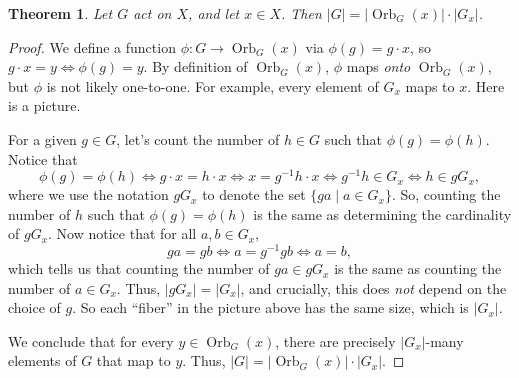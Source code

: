\documentclass[11pt]{amsart}
\theoremstyle{plain}
\newtheorem*{theorem*}{Theorem}
\theoremstyle{definition}
\theoremstyle{remark}
\DeclareMathOperator{\Orb}{Orb}
\begin{document}
\begin{theorem*}
Let $G$ act on $X$, and let $x\in X$. Then $|G| = |\Orb_G(x)|\cdot |G_x|$.
\end{theorem*}
\begin{proof}
We define a function $\phi: G \rightarrow \Orb_G(x)$ via $\phi(g) = g\cdot x$, so  $g\cdot x =  y \iff \phi(g) = y$. By definition of $\Orb_G(x)$, $\phi$ maps \emph{onto} $\Orb_G(x)$, but $\phi$ is  not likely one-to-one. For example, every element of $G_x$ maps to $x$. Here is a picture.
\begin{center}
\end{center}

For a given $g\in G$, let's count the number of $h\in G$ such that $\phi(g) = \phi(h)$. Notice that \[\phi(g) = \phi(h) \iff g\cdot x = h\cdot x \iff x = g^{-1}h\cdot x \iff g^{-1}h\in G_x \iff h\in gG_x,\]
where we use the notation $gG_x$ to denote the set $\{ga \mid a\in G_x\}$. So,  counting the number of $h$ such that $\phi(g) = \phi(h)$ is the same as determining the cardinality of  $gG_x$. 
Now notice that for all $a,b\in G_x$, 
\[ga = gb \iff a = g^{-1}gb \iff a = b,\]
which tells us that counting the number of $ga\in gG_x$ is the same as counting the number of $a\in G_x$. Thus, $|gG_x| = |G_x|$, and crucially, this does \emph{not} depend on the choice of $g$. So each ``fiber'' in the picture above has the same size, which is $|G_x|$. 

We conclude that for every $y \in \Orb_G(x)$, there are precisely $|G_x|$-many elements of $G$ that map to $y$. Thus, $|G| = |\Orb_G(x)|\cdot |G_x|$.
\end{proof}
\end{document}
